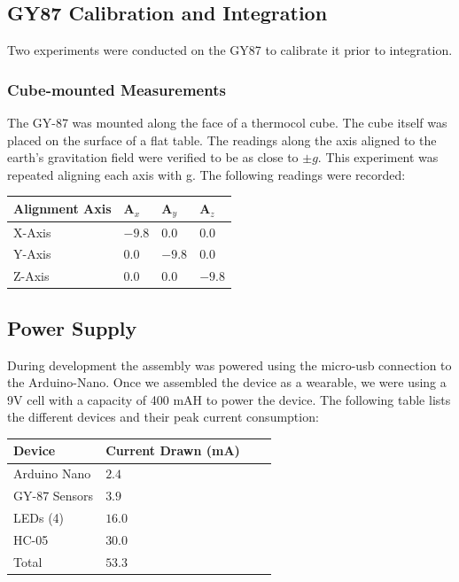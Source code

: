 \documentclass[11pt, a4paper]{article}
\begin{document}
\subsection{GY87 Calibration and Integration}
Two experiments were conducted on the GY87 to calibrate it prior to
integration.

\subsubsection{Cube-mounted Measurements}
The GY-87 was mounted along the face of a thermocol cube. The cube itself was
placed on the surface of a flat table. The readings along the axis aligned to
the earth's gravitation field were verified to be as close to $\pm g$. This
experiment was repeated aligning each axis with g. The following readings were
recorded:

\begin{center}
   \begin{tabular}{llll}
      \hline
      Alignment Axis & A$_{x}$ & A$_{y}$ & A$_{z}$\\
      \hline
      X-Axis & $-9.8$ & $0.0$ & $0.0$ \\
      Y-Axis & $0.0$ & $-9.8$ & $0.0$ \\
      Z-Axis & $0.0$ & $0.0$ & $-9.8$ \\
      \hline
   \end{tabular}
\end{center}


\subsection{Power Supply}
During development the assembly was powered using the micro-usb connection to
the Arduino-Nano. Once we assembled the device as a wearable, we were using a
9V cell with a capacity of 400 mAH to power the device. The following table
lists the different devices and their peak current consumption:

\begin{center}
   \begin{tabular}{llll}
      \hline
      Device & Current Drawn (mA) \\
      \hline
      Arduino Nano & $2.4$ \\
      GY-87 Sensors & $3.9$ \\
      LEDs (4) & $16.0$ & \\
      HC-05 & $30.0$ \\
      \hline
      Total & $53.3$ \\
      \hline
   \end{tabular}
\end{center}
\end{document}
